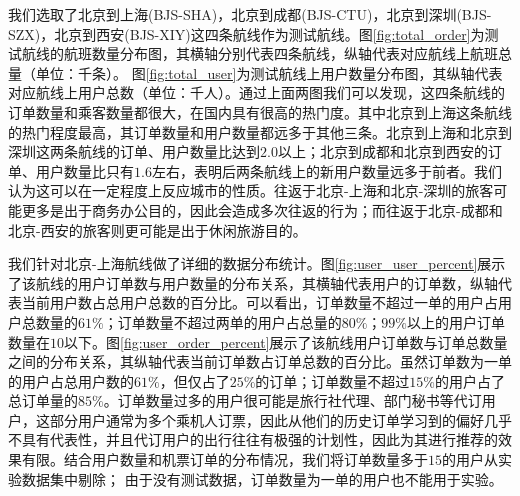 \begin{figure}[!h]
\centering
{}
\end{figure}

我们选取了北京到上海(BJS-SHA)，北京到成都(BJS-CTU)，北京到深圳(BJS-SZX)，北京到西安(BJS-XIY)这四条航线作为测试航线。图\ref{fig:total_order}为测试航线的航班数量分布图，其横轴分别代表四条航线，纵轴代表对应航线上航班总量（单位：千条）。
图\ref{fig:total_user}为测试航线上用户数量分布图，其纵轴代表对应航线上用户总数（单位：千人）。通过上面两图我们可以发现，这四条航线的订单数量和乘客数量都很大，在国内具有很高的热门度。其中北京到上海这条航线的热门程度最高，其订单数量和用户数量都远多于其他三条。北京到上海和北京到深圳这两条航线的订单、用户数量比达到$2.0$以上；北京到成都和北京到西安的订单、用户数量比只有$1.6$左右，表明后两条航线上的新用户数量远多于前者。我们认为这可以在一定程度上反应城市的性质。往返于北京-上海和北京-深圳的旅客可能更多是出于商务办公目的，因此会造成多次往返的行为；而往返于北京-成都和北京-西安的旅客则更可能是出于休闲旅游目的。

\begin{figure}[!h]
\centering
{}
\end{figure}

我们针对北京-上海航线做了详细的数据分布统计。图\ref{fig:user_user_percent}展示了该航线的用户订单数与用户数量的分布关系，其横轴代表用户的订单数，纵轴代表当前用户数占总用户总数的百分比。可以看出，订单数量不超过一单的用户占用户总数量的$61\%$；订单数量不超过两单的用户占总量的$80\%$；$99\%$以上的用户订单数量在$10$以下。图\ref{fig:user_order_percent}展示了该航线用户订单数与订单总数量之间的分布关系，其纵轴代表当前订单数占订单总数的百分比。虽然订单数为一单的用户占总用户数的$61\%$，但仅占了$25\%$的订单；订单数量不超过$15\%$的用户占了总订单量的$85\%$。订单数量过多的用户很可能是旅行社代理、部门秘书等代订用户，这部分用户通常为多个乘机人订票，因此从他们的历史订单学习到的偏好几乎不具有代表性，并且代订用户的出行往往有极强的计划性，因此为其进行推荐的效果有限。结合用户数量和机票订单的分布情况，我们将订单数量多于$15$的用户从实验数据集中剔除；
由于没有测试数据，订单数量为一单的用户也不能用于实验。


